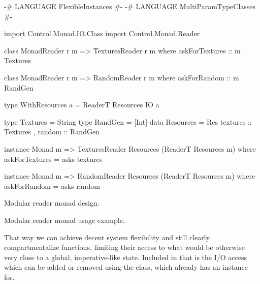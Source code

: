\documentclass[
  digital, %
  color,   %
  table,   %
  oneside, %
  lof,     %
  lot,     %
]{fithesis3}
\begin{document}
{%
\begin{listing}
\begin{haskell}
{-# LANGUAGE FlexibleInstances #-}
{-# LANGUAGE MultiParamTypeClasses #-}

import Control.Monad.IO.Class
import Control.Monad.Reader

class MonadReader r m => TexturesReader r m where
    askForTextures :: m Textures

class MonadReader r m => RandomReader r m where
    askForRandom :: m RandGen

type WithResources a = ReaderT Resources IO a

type Textures = String
type RandGen = [Int]
data Resources =
    Res
    { textures :: Textures
    , random   :: RandGen
    }

instance Monad m => TexturesReader Resources (ReaderT Resources m) where
    askForTextures = asks textures

instance Monad m => RandomReader Resources (ReaderT Resources m) where
    askForRandom = asks random
\end{haskell}
\caption{Modular reader monad design.}
\label{lst:dreamdesign}
\end{listing}

\begin{listing}
\caption{Modular reader monad usage example.}
\label{lst:usedream}
\end{listing}

That way we can achieve decent system flexibility and still clearly compartmentalize
functions, limiting their access to what would be otherwise very close to a global,
imperative-like state. Included in that is the  I/O access which can be added or removed
using the  class, which  already has an instance for.




}
\end{document}
